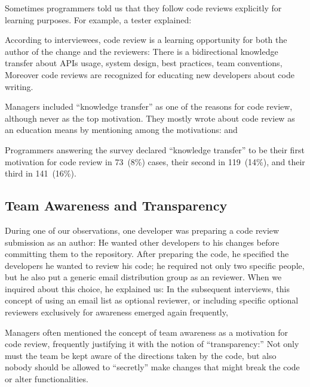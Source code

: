 Sometimes programmers told us that they follow code reviews explicitly for
learning purposes. For example, a tester explained: 

According to interviewees, code review is a learning opportunity for both the
author of the change and the reviewers: There is a bidirectional knowledge
transfer about APIs usage, system design, best practices, team conventions,
 \etc Moreover code reviews are recognized
for educating new developers about code writing.

Managers included ``knowledge transfer'' as one of the reasons for code review,
although never as the top motivation. They mostly wrote about code review as an
education means by mentioning among the motivations:
  and 

Programmers answering the survey declared ``knowledge transfer'' to be their
first motivation for code review in 73~(8\%) cases, their second in 119~(14\%),
and their third in 141~(16\%).

\subsection{Team Awareness and Transparency}

During one of our observations, one developer was preparing a code review
submission as an author: He wanted other developers to 
his changes before committing them to the repository. After preparing the code,
he specified the developers he wanted to review his code; he required not only
two specific people, but he also put a generic email distribution group as an
 reviewer. When we inquired about this choice, he explained
us:  In the subsequent
interviews, this concept of using an email list as optional reviewer, or
including specific optional reviewers exclusively for awareness emerged again
frequently, \eg {}

Managers often mentioned the concept of team awareness as a motivation for code
review, frequently justifying it with the notion of ``transparency:'' Not only
must the team be kept aware of the directions taken by the code, but also
nobody should be allowed to ``secretly'' make changes that might break the code
or alter functionalities.

